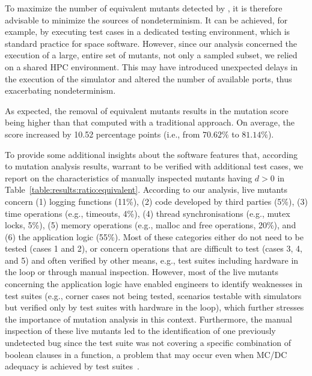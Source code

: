 To maximize the number of equivalent mutants detected by \APPR, it is therefore advisable to minimize the sources of nondeterminism. It can be achieved, for example, by executing test cases in a dedicated testing environment, which is standard practice for space software. However, since our analysis concerned the execution of a large, entire set of mutants, not only a sampled subset, we relied on a shared HPC environment. This may have introduced unexpected delays in the execution of the simulator and altered the number of available ports, thus exacerbating nondeterminism.

As expected, the removal of equivalent mutants results in the \APPR mutation score being higher than that computed with a traditional approach. On average, the score increased by 10.52 percentage points (i.e., from $70.62\%$ to $81.14\%$). 

To provide some additional insights about the software features that, according to \APPR mutation analysis results, 
warrant to be verified with additional test cases, we report on the characteristics of
manually inspected mutants having $d > 0$ in Table~\ref{table:results:ratio:equivalent}.
According to our analysis, live mutants concern (1) logging functions (11\%),  (2) code developed by third parties (5\%), (3) time operations (e.g., timeouts, 4\%), (4) thread synchronisations (e.g., mutex locks, 5\%), (5) memory operations (e.g., malloc and free operations, 20\%), and (6) the application logic (55\%). Most of these categories either do not need to be tested (cases 1 and 2), or concern operations that are difficult to test (cases 3, 4, and 5) and often verified by other means, e.g., test suites including hardware in the loop or through manual inspection. However, most of the live mutants concerning the application logic have enabled engineers to identify weaknesses  in test suites
(e.g., corner cases not being tested, scenarios testable with simulators but verified only by test suites with hardware in the loop), 
which further stresses the importance of mutation analysis in this context.
Furthermore, the manual inspection of these live mutants led to the identification of 
one previously undetected bug
 {since the test suite was not covering a specific combination of boolean clauses in a function, a problem that may occur even when MC/DC adequacy is achieved by test suites~\cite{Gay2016}.}


